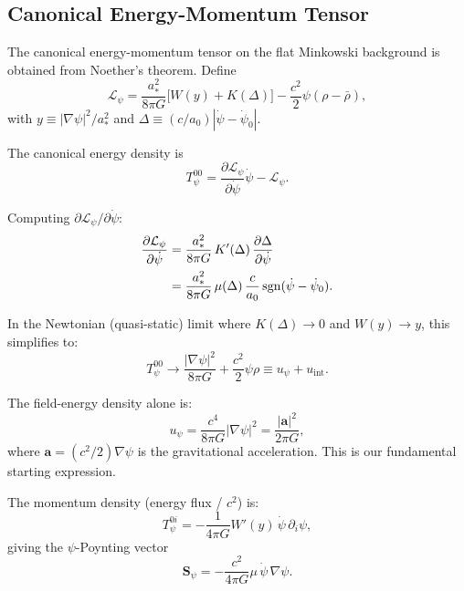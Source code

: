 \documentclass[aps,prd,twocolumn,showpacs,preprintnumbers,superscriptaddress,nofootinbib]{revtex4-2}
\newcommand{\astar}{a_*}
\newcommand{\Wfunc}{W}
\newcommand{\mufunction}{\mu}
\newcommand{\psidot}{\dot{\psi}}
\begin{document}
\subsection{Canonical Energy-Momentum Tensor}\label{sec:canonical-emt}

The canonical energy-momentum tensor on the flat Minkowski background is
obtained from Noether's theorem.  Define
\begin{equation}
\mathcal{L}_\psi = \frac{\astar^2}{8\pi G}\bigl[\Wfunc(y) + K(\Delta)\bigr]
  - \frac{c^2}{2}\psi(\rho - \bar\rho),
\end{equation}
with $y \equiv |\nabla\psi|^2/\astar^2$ and
$\Delta \equiv (c/a_0)|\psidot - \psidot_0|$.

The canonical energy density is
\begin{equation}\label{eq:T00}
T^{00}_\psi = \frac{\partial\mathcal{L}_\psi}{\partial\psidot}\psidot
  - \mathcal{L}_\psi.
\end{equation}

Computing $\partial\mathcal{L}_\psi/\partial\psidot$:
\begin{align}
\frac{\partial\mathcal{L}_\psi}{\partial\psidot}
  &= \frac{\astar^2}{8\pi G}\,K'(\Delta)\,
     \frac{\partial\Delta}{\partial\psidot} \notag\\
  &= \frac{\astar^2}{8\pi G}\,\mufunction(\Delta)\,
     \frac{c}{a_0}\,\mathrm{sgn}(\psidot - \psidot_0).
\end{align}

In the Newtonian (quasi-static) limit where $K(\Delta)\to 0$ and
$\Wfunc(y) \to y$, this simplifies to:
\begin{equation}\label{eq:T00-newton}
T^{00}_\psi \to \frac{|\nabla\psi|^2}{8\pi G}
  + \frac{c^2}{2}\psi\rho \equiv u_\psi + u_{\mathrm{int}}.
\end{equation}

The field-energy density alone is:
\begin{equation}\label{eq:upsi-def}
\boxed{u_\psi = \frac{c^4}{8\pi G}|\nabla\psi|^2
  = \frac{|\mathbf{a}|^2}{2\pi G},}
\end{equation}
where $\mathbf{a} = (c^2/2)\nabla\psi$ is the gravitational
acceleration.  This is our fundamental starting expression.

The momentum density (energy flux / $c^2$) is:
\begin{equation}\label{eq:T0i}
T^{0i}_\psi = -\frac{1}{4\pi G}\Wfunc'(y)\,\psidot\,\partial_i\psi,
\end{equation}
giving the $\psi$-Poynting vector
\begin{equation}\label{eq:poynting}
\mathbf{S}_\psi = -\frac{c^2}{4\pi G}\mufunction\,\psidot\,\nabla\psi.
\end{equation}
\end{document}
